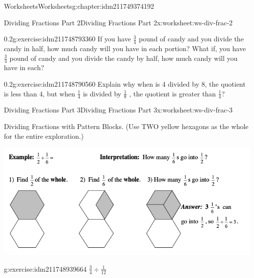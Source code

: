 \documentclass[twoside,11pt,]{book}
\begin{document}
\begin{chapterptx}{Worksheets}{}{Worksheets}{}{}{g:chapter:idm211749374192}
\begin{worksheet-section-numberless}{Dividing Fractions Part 2}{}{Dividing Fractions Part 2}{}{}{x:worksheet:ws-div-frac-2}
\begin{divisionexercise}{6}{}{0.2}{g:exercise:idm211748793360}%
If you have \(\frac{3}{4} \) pound of candy and you divide the candy in half, how much candy will you have in each portion? What if, you have \(\frac{3}{4} \) pound of candy and you divide the candy by half, how much candy will you have in each?%
\end{divisionexercise}%
\clearpage
\begin{divisionexercise}{7}{}{0.2}{g:exercise:idm211748790560}%
Explain why when is 4 divided by 8, the quotient is less than 4, but when \(\frac{1}{4} \)  is divided by \(\frac{1}{8} \) , the quotient is greater than \(\frac{1}{4} \)?%
\end{divisionexercise}%
\end{worksheet-section-numberless}
\restoregeometry
%
%
\typeout{************************************************}
\typeout{************************************************}
%
\begin{worksheet-section-numberless}{Dividing Fractions Part 3}{}{Dividing Fractions Part 3}{}{}{x:worksheet:ws-div-frac-3}
\begin{introduction}{}%
Dividing Fractions with Pattern Blocks. (Use TWO yellow hexagons as the whole for the entire exploration.)%
\begin{sidebyside}{1}{0}{0}{0}%
\begin{sbspanel}{1}%
\includegraphics[width=1\linewidth]{images/frac-div-hex-1.png}
\end{sbspanel}%
\end{sidebyside}%
\end{introduction}%
\begin{divisionexercise}{1}{}{}{g:exercise:idm211748939664}%
\(\frac{3}{4} \div \frac{1}{12} \)%
\begin{sidebyside}{1}{0.15}{0.15}{0}%
\begin{sbspanel}{0.7}%

\end{sbspanel}
\end{sidebyside}
\end{divisionexercise}
\end{worksheet-section-numberless}
\end{chapterptx}
\end{document}
